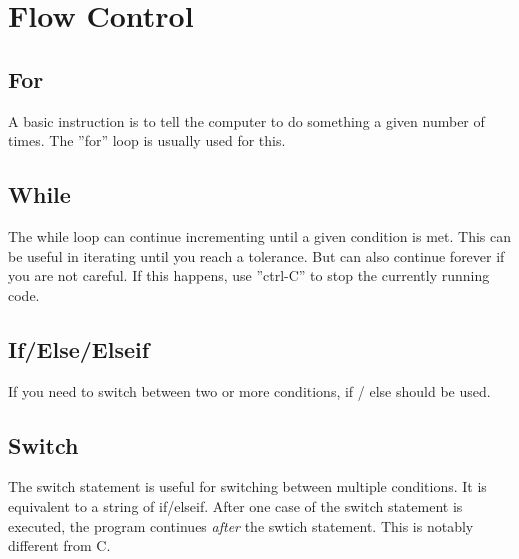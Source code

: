 
\pagebreak
\section{Flow Control}

\subsection{For}
A basic instruction is to tell the computer to do something a given number of times.
 The ''for'' loop is usually used for this.

\begin{quote}

\end{quote}
\noindent

\pagebreak
\subsection{While}
The while loop can continue incrementing until a given condition is met.
 This can be useful in iterating until you reach a tolerance.
 But can also continue forever if you are not careful.
 If this happens, use ''ctrl-C'' to stop the currently running code.

\begin{quote}

\end{quote}

\pagebreak
\subsection{If/Else/Elseif}
If you need to switch between two or more conditions, if / else should be used.

\begin{quote}

\end{quote}

\pagebreak
\subsection{Switch}
The switch statement is useful for switching between multiple conditions.
 It is equivalent to a string of if/elseif.
 After one case of the switch statement is executed, the program continues \emph{after} the swtich statement.
 This is notably different from C.

\begin{quote}

\end{quote}

